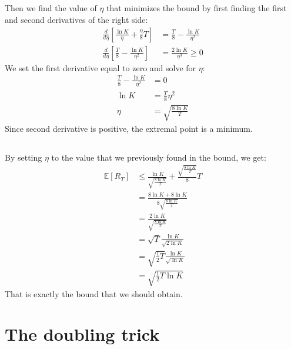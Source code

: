 \documentclass[a4paper]{article}
\begin{document}
\subsection{}
\label{subsec:22}
Then we find the value of $\eta$ that minimizes the bound by first finding the
first and second derivatives of the right side:
\begin{align*}
  \frac{d}{d\eta} \left[\frac{\ln{K}}{\eta} + \frac{\eta}{8}T\right]&=
  \frac{T}{8} - \frac{\ln{K}}{\eta^2}\\
  \frac{d}{d\eta} \left[\frac{T}{8} - \frac{\ln{K}}{\eta^2} \right]
  &= \frac{2\ln{K}}{\eta^3} \geq 0 \tag{since $\eta > 0$ and $K>1$}
\end{align*}
We set the first derivative equal to zero and solve for $\eta$:
\begin{align*}
\frac{T}{8} - \frac{\ln{K}}{\eta^2} &= 0\\
\ln{K} &= \frac{T}{8}\eta^2\\
\eta &= \sqrt{\frac{8\ln{K}}{T}}
\end{align*}
Since second derivative is positive, the extremal point is a minimum.
\subsection{}
\label{subsec:23}
By setting $\eta$ to the value that we previously found in the bound, we get:
\begin{align*}
  \mathbb{E}\left[R_{T}\right] &\leq
  \frac{\ln K}{\sqrt{\frac{8\ln{K}}{T}}}+\frac{\sqrt{\frac{8\ln{K}}{T}}}{8} T\\
  &= \frac{8\ln{K} + 8\ln{K}} {8\sqrt{\frac{8\ln{K}}{T}}}\\
  &= \frac{2\ln{K}}{\sqrt{\frac{8\ln{K}}{T}}}\\
  &= \sqrt{T} \frac{\ln{K}}{\sqrt{2\ln{K}}}\\
  &= \sqrt{\frac{1}{2}T} \frac{\ln{K}}{\sqrt{\ln{K}}}\\
  &= \sqrt{\frac{1}{2}T \ln{K}}
\end{align*}
That is exactly the bound that we should obtain.

\section{The doubling trick}
\label{sec:3}
\end{document}
